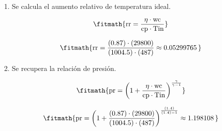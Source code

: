 \begin{enumerate}

\item Se calcula el aumento relativo de temperatura ideal.

\[\fitmath{\mathrm{rr}=\frac{\eta\cdot \mathrm{wc}}{\mathrm{cp}\cdot \mathrm{Tin}}}\]

\[\fitmath{\mathrm{rr}=\frac{(0.87)\cdot (29800)}{(1004.5)\cdot (487)}\approx 0.05299765\,}\]

\item Se recupera la relación de presión.

\[\fitmath{\mathrm{pr}={\left(1+\frac{\eta\cdot \mathrm{wc}}{\mathrm{cp}\cdot \mathrm{Tin}}\right)}^{\frac{\gamma}{\gamma-1}}}\]

\[\fitmath{\mathrm{pr}={\left(1+\frac{(0.87)\cdot (29800)}{(1004.5)\cdot (487)}\right)}^{\frac{(1.4)}{(1.4)-1}}\approx 1.198108\,}\]

\end{enumerate}

